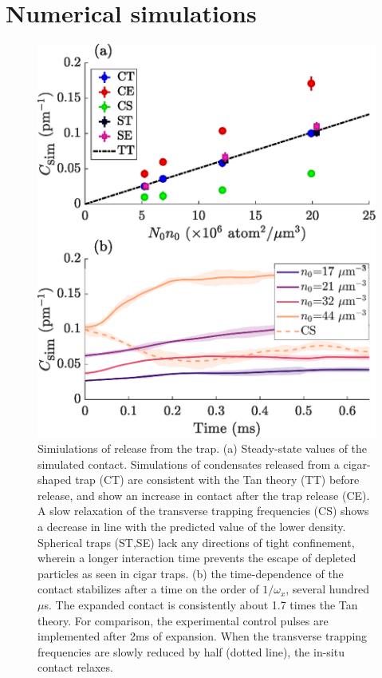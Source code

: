 \section{Numerical simulations}
\label{STAB}
	\begin{figure}
	        \includegraphics[width=\columnwidth]{fig/depletion/sim_results.eps}
	        \caption{Simiulations of release from the trap. (a) Steady-state values of the simulated contact. Simulations of condensates released from a cigar-shaped trap (CT) are consistent with the Tan theory (TT) before release, and show an increase in contact after the trap release (CE). A slow relaxation of the transverse trapping frequencies (CS) shows a decrease in line with the predicted value of the lower density. Spherical traps (ST,SE) lack any directions of tight confinement, wherein a longer interaction time prevents the escape of depleted particles as seen in cigar traps. (b) the time-dependence of the contact stabilizes after a time on the order of $1/\omega_x$, several hundred $\mu$s. The expanded contact is consistently about 1.7 times the Tan theory. For comparison, the experimental control pulses are implemented after 2ms of expansion. When the transverse trapping frequencies are slowly reduced by half (dotted line), the in-situ contact relaxes.}
	        \label{fig:sim_fig}
	\end{figure}
